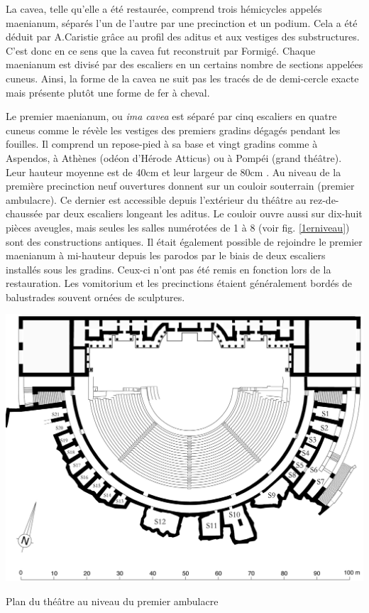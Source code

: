 		La  \gls{cavea}, telle qu'elle a été restaurée, comprend trois hémicycles appelés \gls{maenianum}, séparés l'un de l'autre par une \gls{precinction} et un \gls{podium}. Cela a été déduit par A.Caristie grâce au profil des \gls{aditus} et aux vestiges des substructures. C'est donc en ce sens que la cavea fut reconstruit par Formigé. Chaque \gls{maenianum} est divisé par des escaliers en un certains nombre de sections appelées \gls{cuneus}. Ainsi, la forme de la \gls{cavea} ne suit pas les tracés de \cite{vitruve} de demi-cercle exacte mais présente plutôt une forme de fer à cheval.
		
		Le premier \gls{maenianum}, ou \textit{ima cavea} est séparé par cinq escaliers en quatre \gls{cuneus} comme le révèle les vestiges des premiers gradins dégagés pendant les fouilles. Il comprend un repose-pied à sa base et vingt gradins comme à Aspendos, à Athènes (odéon d'Hérode Atticus) ou à Pompéi (grand théâtre). Leur hauteur moyenne est de 40cm et leur largeur de 80cm \cite{formige}. Au niveau de la première \gls{precinction} neuf ouvertures donnent  sur un couloir souterrain (premier \gls{ambulacre}). Ce dernier est accessible depuis l'extérieur du théâtre au rez-de-chaussée par deux escaliers longeant les \gls{aditus}. Le couloir ouvre aussi sur dix-huit pièces aveugles, mais seules les salles numérotées de 1 à 8 (voir fig. \ref{1erniveau}) sont des constructions antiques. Il était également possible de rejoindre le premier \gls{maenianum} à mi-hauteur depuis les \gls{parodos} par le biais de deux escaliers installés sous les gradins. Ceux-ci n'ont pas été remis en fonction lors de la restauration. Les \gls{vomitorium} et les \glspl{precinction} étaient généralement bordés de balustrades souvent ornées de sculptures.
		
	\begin{figureth}
		\includegraphics[width=\linewidth]{images/1erniveau}
		\caption[Vue de dessus - 1er niveau]{Plan du théâtre au niveau du premier ambulacre \cite[Pl. XVII et XX fusionnées]{orangePl}}
		\label{1erniveau}
	\end{figureth}		
		
